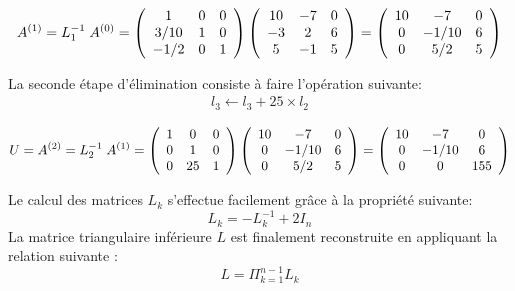 \documentclass[a4paper, 10pt]{article}
\begin{document}
\begin{equation}
 A^{(1)}=L^{-1}_1 \; A^{(0)}=
  \left(
\begin{array}{c c c}
1  & 0   &  0  \\
3/10  &  1   & 0  \\
-1/2  &  0  &  1  
\end{array}
\right)
 \left(
\begin{array}{c c c}
10  & -7   &  0  \\
-3  &  2   & 6   \\
 5  &  -1  &  5  
\end{array}
\right)
=
 \left(
\begin{array}{c c c}
10  & -7   &  0  \\
0  &  -1/10   & 6   \\
0  &  5/2  &  5  
\end{array}
\right)
\end{equation}

La seconde étape d'élimination consiste à faire l'opération suivante: 
\begin{equation}
 \begin{array}{c}
  l_3 \leftarrow l_3 +25\times l_2 
\end{array}
\end{equation}

\begin{equation}
 U=A^{(2)}=L^{-1}_2 \;   A^{(1)}=
  \left(
\begin{array}{c c c}
1  & 0   &  0  \\
0  &  1   & 0  \\
0  &  25  &  1  
\end{array}
\right)
 \left(
\begin{array}{c c c}
10  & -7   &  0  \\
0  &  -1/10  &  6  \\
0  &  5/2   & 5   
\end{array}
\right)
=
 \left(
\begin{array}{c c c}
   10 &   -7 &   0\\
     0 &  -1/10  &   6\\
         0    &     0 & 155
\end{array}
\right)
\end{equation}

\noindent 
Le calcul des matrices $L_k$ s'effectue facilement grâce à la propriété suivante:
 \begin{equation}
 L_k=-L_k^{-1}+2I_n
 \end{equation}
 La matrice triangulaire inférieure $L$ est finalement reconstruite en appliquant la relation suivante :
  \begin{equation}
 L= \Pi_{k=1}^{n-1}  L_k
 \end{equation}
\end{document}
